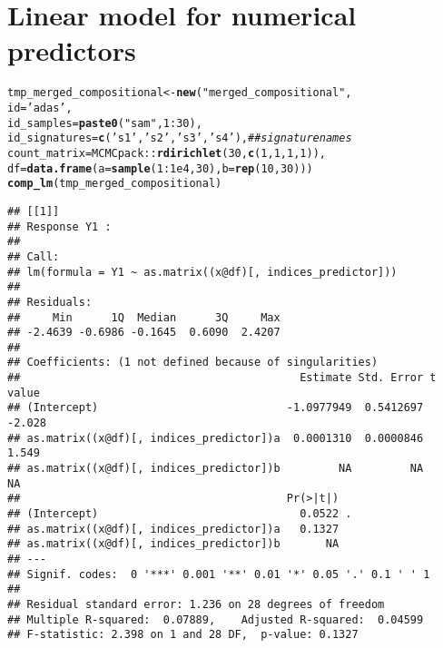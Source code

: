 \documentclass{article}\usepackage[]{graphicx}\usepackage[]{color}
\makeatletter
\newcommand{\hlnum}[1]{\textcolor[rgb]{0.686,0.059,0.569}{#1}}%
\newcommand{\hlstr}[1]{\textcolor[rgb]{0.192,0.494,0.8}{#1}}%
\newcommand{\hlcom}[1]{\textcolor[rgb]{0.678,0.584,0.686}{\textit{#1}}}%
\newcommand{\hlopt}[1]{\textcolor[rgb]{0,0,0}{#1}}%
\newcommand{\hlstd}[1]{\textcolor[rgb]{0.345,0.345,0.345}{#1}}%
\newcommand{\hlkwb}[1]{\textcolor[rgb]{0.69,0.353,0.396}{#1}}%
\newcommand{\hlkwc}[1]{\textcolor[rgb]{0.333,0.667,0.333}{#1}}%
\newcommand{\hlkwd}[1]{\textcolor[rgb]{0.737,0.353,0.396}{\textbf{#1}}}%
\newenvironment{kframe}{%
 \def\at@end@of@kframe{}%
 \ifinner\ifhmode%
  \def\at@end@of@kframe{\end{minipage}}%
  \begin{minipage}{\columnwidth}%
 \fi\fi%
 \def\FrameCommand##1{\hskip\@totalleftmargin \hskip-\fboxsep
 \colorbox{shadecolor}{##1}\hskip-\fboxsep
     \hskip-\linewidth \hskip-\@totalleftmargin \hskip\columnwidth}%
 \MakeFramed {\advance\hsize-\width
   \@totalleftmargin\z@ \linewidth\hsize
   \@setminipage}}%
 {\par\unskip\endMakeFramed%
 \at@end@of@kframe}
\newenvironment{knitrout}{}{} %
\makeatother
\begin{document}
\section{Linear model for numerical predictors}
\begin{knitrout}
\color{fgcolor}\begin{kframe}
\begin{alltt}
\hlstd{tmp_merged_compositional} \hlkwb{<-} \hlkwd{new}\hlstd{(}\hlstr{"merged_compositional"}\hlstd{,}
                                \hlkwc{id}\hlstd{=}\hlstr{'adas'}\hlstd{,}
                                \hlkwc{id_samples}\hlstd{=}\hlkwd{paste0}\hlstd{(}\hlstr{"sam"}\hlstd{,} \hlnum{1}\hlopt{:}\hlnum{30}\hlstd{),}
                                \hlkwc{id_signatures}\hlstd{=} \hlkwd{c}\hlstd{(}\hlstr{'s1'}\hlstd{,} \hlstr{'s2'}\hlstd{,} \hlstr{'s3'}\hlstd{,} \hlstr{'s4'}\hlstd{),} \hlcom{## signature names}
                                \hlkwc{count_matrix}\hlstd{=MCMCpack}\hlopt{::}\hlkwd{rdirichlet}\hlstd{(}\hlnum{30}\hlstd{,} \hlkwd{c}\hlstd{(}\hlnum{1}\hlstd{,}\hlnum{1}\hlstd{,}\hlnum{1}\hlstd{,}\hlnum{1}\hlstd{)),}
                                \hlkwc{df}\hlstd{=}\hlkwd{data.frame}\hlstd{(}\hlkwc{a}\hlstd{=}\hlkwd{sample}\hlstd{(}\hlnum{1}\hlopt{:}\hlnum{1e4}\hlstd{,} \hlnum{30}\hlstd{),} \hlkwc{b}\hlstd{=}\hlkwd{rep}\hlstd{(}\hlnum{10}\hlstd{,} \hlnum{30}\hlstd{)))}
\hlkwd{comp_lm}\hlstd{(tmp_merged_compositional)}
\end{alltt}
\begin{verbatim}
## [[1]]
## Response Y1 :
## 
## Call:
## lm(formula = Y1 ~ as.matrix((x@df)[, indices_predictor]))
## 
## Residuals:
##     Min      1Q  Median      3Q     Max 
## -2.4639 -0.6986 -0.1645  0.6090  2.4207 
## 
## Coefficients: (1 not defined because of singularities)
##                                           Estimate Std. Error t value
## (Intercept)                             -1.0977949  0.5412697  -2.028
## as.matrix((x@df)[, indices_predictor])a  0.0001310  0.0000846   1.549
## as.matrix((x@df)[, indices_predictor])b         NA         NA      NA
##                                         Pr(>|t|)  
## (Intercept)                               0.0522 .
## as.matrix((x@df)[, indices_predictor])a   0.1327  
## as.matrix((x@df)[, indices_predictor])b       NA  
## ---
## Signif. codes:  0 '***' 0.001 '**' 0.01 '*' 0.05 '.' 0.1 ' ' 1
## 
## Residual standard error: 1.236 on 28 degrees of freedom
## Multiple R-squared:  0.07889,	Adjusted R-squared:  0.04599 
## F-statistic: 2.398 on 1 and 28 DF,  p-value: 0.1327

\end{verbatim}
\end{kframe}
\end{knitrout}
\end{document}
